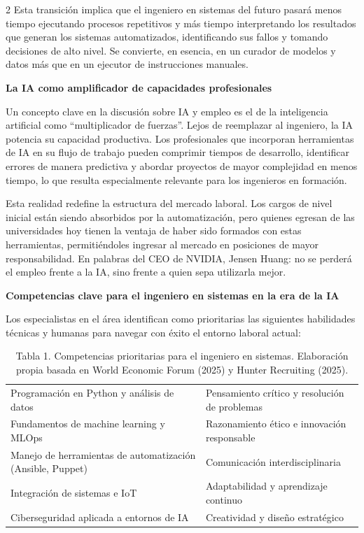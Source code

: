 \documentclass[10pt,spanish,Letterpaper,openany]{book}
\let\origtextbf\textbf
\renewcommand{\textbf}[1]{{\color{textlinetitle}\origtextbf{#1}}}
\begin{document}
\begin {multicols}{2}
Esta transición implica que el ingeniero en sistemas del futuro pasará menos tiempo ejecutando procesos repetitivos y más tiempo interpretando los resultados que generan los sistemas automatizados, identificando sus fallos y tomando decisiones de alto nivel. Se convierte, en esencia, en un curador de modelos y datos más que en un ejecutor de instrucciones manuales.

\textbf{La IA como amplificador de capacidades profesionales}

Un concepto clave en la discusión sobre IA y empleo es el de la inteligencia artificial como ``multiplicador de fuerzas''. Lejos de reemplazar al ingeniero, la IA potencia su capacidad productiva. Los profesionales que incorporan herramientas de IA en su flujo de trabajo pueden comprimir tiempos de desarrollo, identificar errores de manera predictiva y abordar proyectos de mayor complejidad en menos tiempo, lo que resulta especialmente relevante para los ingenieros en formación.

Esta realidad redefine la estructura del mercado laboral. Los cargos de nivel inicial están siendo absorbidos por la automatización, pero quienes egresan de las universidades hoy tienen la ventaja de haber sido formados con estas herramientas, permitiéndoles ingresar al mercado en posiciones de mayor responsabilidad. En palabras del CEO de NVIDIA, Jensen Huang: no se perderá el empleo frente a la IA, sino frente a quien sepa utilizarla mejor.

\textbf{Competencias clave para el ingeniero en sistemas en la era de la IA}

Los especialistas en el área identifican como prioritarias las siguientes habilidades técnicas y humanas para navegar con éxito el entorno laboral actual:

\end {multicols}

\begin{table}[h]
\centering
\caption*{Tabla 1. Competencias prioritarias para el ingeniero en sistemas. Elaboración propia basada en World Economic Forum (2025) y Hunter Recruiting (2025).}
\begin{tabular}{p{} p{}}
\toprule
\textbf{Habilidades técnicas} & \textbf{Habilidades humanas} \\
\midrule
Programación en Python y análisis de datos & Pensamiento crítico y resolución de problemas \\[6pt]
Fundamentos de machine learning y MLOps & Razonamiento ético e innovación responsable \\[6pt]
Manejo de herramientas de automatización (Ansible, Puppet) & Comunicación interdisciplinaria \\[6pt]
Integración de sistemas e IoT & Adaptabilidad y aprendizaje continuo \\[6pt]
Ciberseguridad aplicada a entornos de IA & Creatividad y diseño estratégico \\
\bottomrule
\end{tabular}
\end{table}
\end{document}
